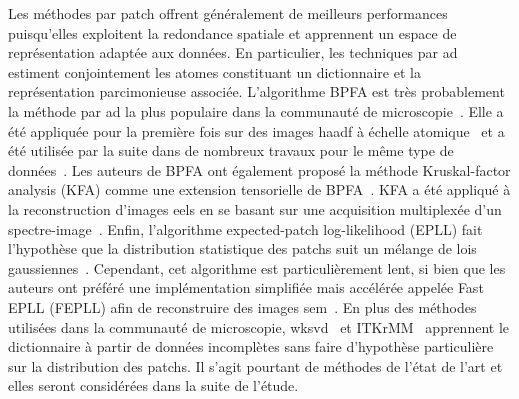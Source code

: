 Les méthodes par patch offrent généralement de meilleurs performances puisqu'elles exploitent la redondance spatiale et apprennent un espace de représentation adaptée aux données. En particulier, les techniques par \gls{ad} estiment conjointement les atomes constituant un dictionnaire et la représentation parcimonieuse associée. %
%
L'algorithme BPFA est très probablement la méthode par \gls{ad} la plus populaire dans la communauté de microscopie~\cite{xing2012siam}. Elle a été appliquée pour la première fois sur des images \gls{haadf} à échelle atomique~\cite{stevens2014potential} et a été utilisée par la suite dans de nombreux travaux pour le même type de données~\cite{mucke2016practical,kovarik2016implementation}.
%
Les auteurs de BPFA ont également proposé la méthode Kruskal-factor analysis (KFA) comme une extension tensorielle de BPFA~\cite{stevens2017tensor}. KFA a été appliqué à la reconstruction d'images \gls{eels} en se basant sur une acquisition multiplexée d'un spectre-image~\cite{stevens2016mm}.
%
Enfin, l'algorithme expected-patch log-likelihood (EPLL) fait l'hypothèse que la distribution statistique des patchs suit un mélange de lois gaussiennes~\cite{zoran2011from}. Cependant, cet algorithme est particulièrement lent, si bien que les auteurs ont préféré une implémentation simplifiée mais accélérée appelée Fast EPLL (FEPLL) afin de reconstruire des images \gls{sem}~\cite{parameswaran2019accelerating}.
%
En plus des méthodes utilisées dans la communauté de microscopie, \gls{wksvd}~\cite{mairal2008tip} et ITKrMM~\cite{naumova2018fast,naumova2017dictionary} apprennent le dictionnaire à partir de données incomplètes sans faire d'hypothèse particulière sur la distribution des patchs. Il s'agit pourtant de méthodes de l'état de l'art et elles seront considérées dans la suite de l'étude.

